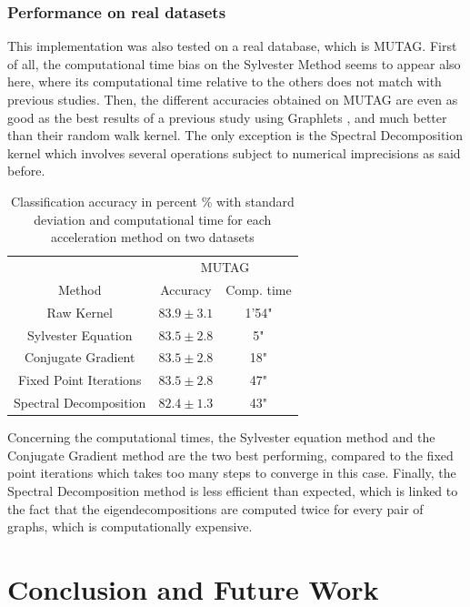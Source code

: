 \documentclass{article}
\theoremstyle{definition}
\begin{document}
\subsubsection{Performance on real datasets}
This implementation was also tested on a real database, which is MUTAG. First of all, the computational time bias on the Sylvester Method seems to appear also here, where its computational time relative to the others does not match with previous studies\cite{vishwanathan_graph_2010,shervashidze_efficient_2009}. Then, the different accuracies obtained  on MUTAG are even as good as the best results of a previous study using Graphlets \cite{shervashidze_efficient_2009}, and much better than their random walk kernel. The only exception is the Spectral Decomposition kernel which involves several operations subject to numerical imprecisions as said before.
\begin{table}[!htb]
	\begin{center}
		\begin{tabular}{|c||c|c|}
			\hline
			& \multicolumn{2}{|c|}{MUTAG}\\
			\cline{2-3}
			Method & Accuracy & Comp. time\\
			\hline 
			Raw Kernel & $83.9\pm 3.1$ & 1'54"\\
			Sylvester Equation & $83.5\pm 2.8$ & 5"\\
			Conjugate Gradient & $83.5\pm 2.8$ & 18"\\
			Fixed Point Iterations & $83.5\pm 2.8$ & 47" \\
			Spectral Decomposition & $82.4\pm 1.3$ & 43"\\
			\hline
		\end{tabular}
	\end{center}
\caption{Classification accuracy in percent \% with standard deviation and computational time for each acceleration method on two datasets}
\end{table}
Concerning the computational times, the Sylvester equation method and the Conjugate Gradient method are the two best performing, compared to the fixed point iterations which takes too many steps to converge in this case. Finally, the Spectral Decomposition method is less efficient than expected, which is linked to the fact that the eigendecompositions are computed twice for every pair of graphs, which is computationally expensive. 

\section{Conclusion and Future Work}
\end{document}
